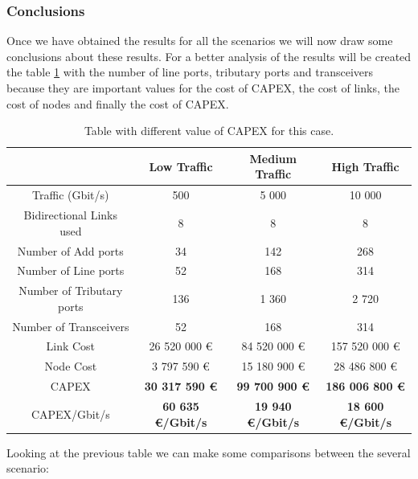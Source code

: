 \vspace{13pt}
\subsubsection{Conclusions}

Once we have obtained the results for all the scenarios we will now draw some conclusions about these results. For a better analysis of the results will be created the table \ref{table_comparative_transp_surv_heuristic} with the number of line ports, tributary ports and transceivers because they are important values for the cost of CAPEX, the cost of links, the cost of nodes and finally the cost of CAPEX.\\

\begin{table}[H]
\centering
\begin{tabular}{| c | c | c | c |}
 \hline
   & Low Traffic & Medium Traffic  & High Traffic \\
 \hline\hline
 Traffic (Gbit/s) & 500 & 5 000 & 10 000 \\ \hline
 Bidirectional Links used & 8 & 8 & 8 \\ \hline
 Number of Add ports & 34 & 142 & 268 \\ \hline
 Number of Line ports & 52 & 168 & 314 \\ \hline
 Number of Tributary ports & 136 & 1 360 & 2 720 \\ \hline
 Number of Transceivers & 52 & 168 & 314 \\ \hline
 Link Cost & 26 520 000 \euro & 84 520 000 \euro & 157 520 000 \euro \\ \hline
 Node Cost & 3 797 590 \euro & 15 180 900 \euro & 28 486 800 \euro \\ \hline
 CAPEX & \textbf{30 317 590 \euro} & \textbf{99 700 900 \euro} & \textbf{186 006 800 \euro} \\ \hline
 CAPEX/Gbit/s & \textbf{60 635 \euro/Gbit/s} & \textbf{19 940 \euro/Gbit/s} & \textbf{18 600 \euro/Gbit/s} \\ \hline
\end{tabular}
\caption{Table with different value of CAPEX for this case.}
\label{table_comparative_transp_surv_heuristic}
\end{table}

\noindent
Looking at the previous table we can make some comparisons between the several scenario:

